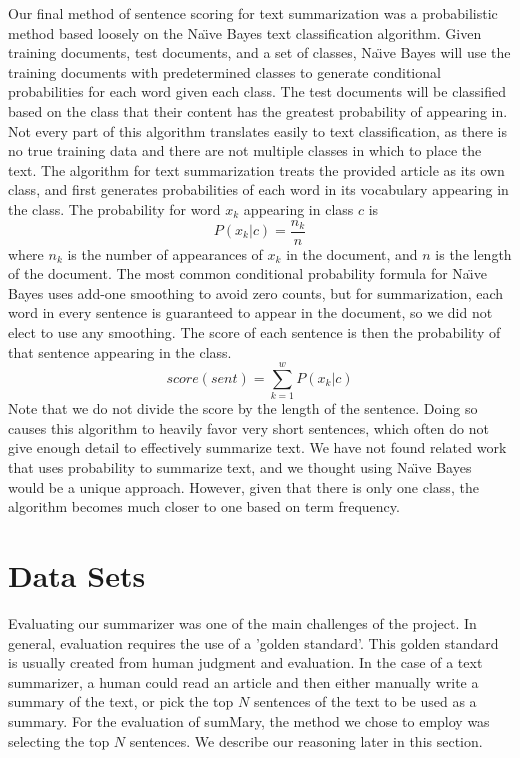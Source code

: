 \documentclass[11pt,a4paper]{article}
\begin{document}
  Our final method of sentence scoring for text summarization was a probabilistic method based loosely on the Na{\"\i}ve Bayes text classification algorithm. Given training documents, test documents, and a set of classes, Na{\"\i}ve Bayes will use the training documents with predetermined classes to generate conditional probabilities for each word given each class. The test documents will be classified based on the class that their content has the greatest probability of appearing in. Not every part of this algorithm translates easily to text classification, as there is no true training data and there are not multiple classes in which to place the text. The algorithm for text summarization treats the provided article as its own class, and first generates probabilities of each word in its vocabulary appearing in the class. The probability for word $x_k$ appearing in class $c$ is
  $$P(x_k|c) = \frac{n_k}{n}$$
  where $n_k$ is the number of appearances of $x_k$ in the document, and $n$ is the length of the document. The most common conditional probability formula for Na{\"\i}ve Bayes uses add-one smoothing to avoid zero counts, but for summarization, each word in every sentence is guaranteed to appear in the document, so we did not elect to use any smoothing. The score of each sentence is then the probability of that sentence appearing in the class.
  $$score(sent) = \sum_{k = 1}^{w} P(x_k|c)$$
  Note that we do not divide the score by the length of the sentence. Doing so causes this algorithm to heavily favor very short sentences, which often do not give enough detail to effectively summarize text.
  We have not found related work that uses probability to summarize text, and we thought using Na{\"\i}ve Bayes would be a unique approach. However, given that there is only one class, the algorithm becomes much closer to one based on term frequency.

  \section{Data Sets}

  Evaluating our summarizer was one of the main challenges of the project. In general, evaluation requires the use of a 'golden standard'. This golden standard is usually created from human judgment and evaluation. In the case of a text summarizer, a human could read an article and then either manually write a summary of the text, or pick the top $N$ sentences of the text to be used as a summary. For the evaluation of sumMary, the method we chose to employ was selecting the top $N$ sentences. We describe our reasoning later in this section.
\end{document}

